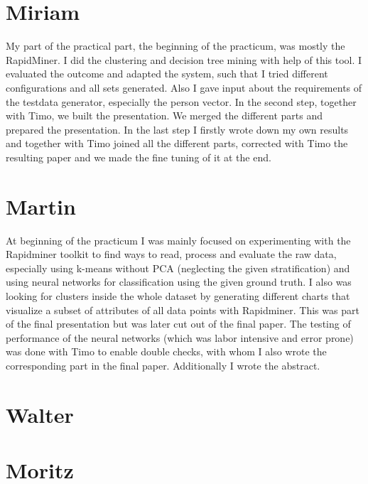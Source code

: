 \documentclass{article}
\begin{document}
	
\section{Miriam}
My part of the practical part, the beginning of the practicum, was mostly the RapidMiner. I did the clustering and decision tree  mining with help of this tool. I evaluated the outcome and adapted the system, such that I tried different configurations and all sets generated. Also I gave input about the requirements of the testdata generator, especially the person vector. In the second step, together with Timo, we built the presentation. We merged the different parts and prepared the presentation. In the last step I firstly wrote down my own results and together with Timo joined all the different parts, corrected with Timo the resulting paper and we made the fine tuning of it at the end.

\section{Martin}
At beginning of the practicum I was mainly focused on experimenting with the Rapidminer toolkit to find ways to read, process and evaluate the raw data, especially using k-means without PCA (neglecting the given stratification) and using neural networks for classification using the given ground truth. I also was looking for clusters inside the whole dataset by generating different charts that visualize a subset of attributes of all data points with Rapidminer. This was part of the final presentation but was later cut out of the final paper. The testing of performance of the neural networks (which was labor intensive and error prone) was done with Timo to enable double checks, with whom I also wrote the corresponding part in the final paper. Additionally I wrote the abstract.

\section{Walter}

\section{Moritz}
\end{document}
